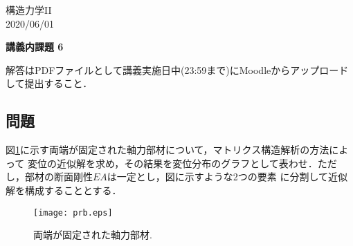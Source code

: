 \documentclass[10pt,a4j]{jarticle}
\newlength{\minitwocolumn}
\begin{document}
\newcommand{\fat}[1]{\mbox{\boldmath $#1$}}
\newcommand{\D}{\partial}
\newcommand{\w}{\omega}
\newcommand{\ga}{\alpha}
\newcommand{\gb}{\beta}
\newcommand{\gx}{\xi}
\newcommand{\gz}{\zeta}
\newcommand{\vhat}[1]{\hat{\fat{#1}}}
\newcommand{\spc}{\vspace{0.7\baselineskip}}
\newcommand{\halfspc}{\vspace{0.3\baselineskip}}

\newcommand{\twofig}[2]
 {
   \begin{figure}
     \begin{minipage}[t]{\minitwocolumn}
         \begin{center}   #1
         \end{center}
     \end{minipage}
         \hspace{\columnsep}
     \begin{minipage}[t]{\minitwocolumn}
         \begin{center} #2
         \end{center}
     \end{minipage}
   \end{figure}
 }
\begin{flushright}
	構造力学II\\
	 2020/06/01
\end{flushright}
\begin{center}
	{\LARGE	\bf 講義内課題 6} 
\end{center}
\vspace{10mm}
解答はPDFファイルとして講義実施日中(23:59まで)にMoodleからアップロードして提出すること．
\subsection*{問題}
図\ref{fig:prb}に示す両端が固定された軸力部材について，マトリクス構造解析の方法によって
変位の近似解を求め，その結果を変位分布のグラフとして表わせ．ただし，部材の断面剛性$EA$は一定とし，図に示すような2つの要素
に分割して近似解を構成することとする．
\begin{figure}[h]
	\begin{center}
	\texttt{[image: prb.eps]} 
	\end{center}
	\caption{両端が固定された軸力部材.} 
	\label{fig:prb}
\end{figure}
\end{document}
